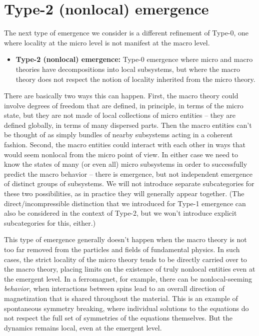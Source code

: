 \documentclass[12pt,english]{article}
\begin{document}
\section*{Type-2 (nonlocal) emergence}

The next type of emergence we consider is a different refinement of Type-0, one where locality at the micro level is not manifest at the macro level. 
\begin{itemize}
    \item \textbf{Type-2 (nonlocal) emergence:} Type-0 emergence where micro and macro theories have decompositions into local subsystems, but where the macro theory does not respect the notion of locality inherited from the micro theory.
\end{itemize}
There are basically two ways this can happen.
First, the macro theory could involve degrees of freedom that are defined, in principle, in terms of the micro state, but they are not made of local collections of micro entities -- they are defined globally, in terms of many dispersed parts.
Then the macro entities can’t be thought of as simply bundles of nearby subsystems acting in a coherent fashion. 
Second, the macro entities could interact with each other in ways that would seem nonlocal from the micro point of view.
In either case we need to know the states of many (or even all) micro subsystems in order to successfully predict the macro behavior – there is emergence, but not independent emergence of distinct groups of subsystems.
We will not introduce separate subcategories for these two possibilities, as in practice they will generally appear together.
(The direct/incompressible distinction that we introduced for Type-1 emergence can also be considered in the context of Type-2, but we won't introduce explicit subcategories for this, either.)

This type of emergence generally doesn't happen when the macro theory is not too far removed from the particles and fields of fundamental physics.
In such cases, the strict locality of the micro theory tends to be directly carried over to the macro theory, placing limits on the existence of truly nonlocal entities even at the emergent level.
In a ferromagnet, for example, there can be nonlocal-seeming \emph{behavior}, when interactions between spins lead to an overall direction of magnetization that is shared throughout the material.
This is an example of spontaneous symmetry breaking, where individual solutions to the equations do not respect the full set of symmetries of the equations themselves.
But the dynamics remains local, even at the emergent level.
\end{document}
